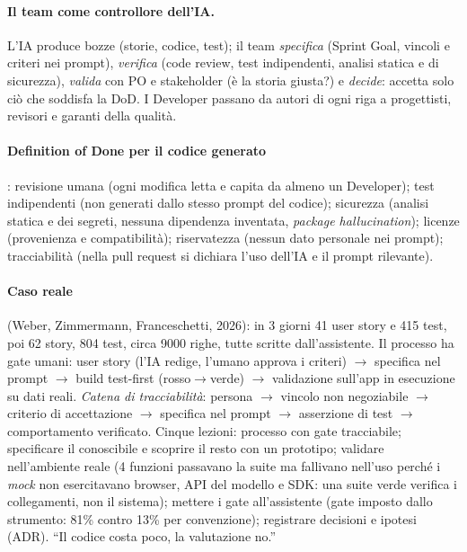 \documentclass[a4paper,12pt]{article}
\begin{document}
\paragraph{Il team come controllore dell'IA.} L'IA produce bozze (storie, codice, test); il
team \emph{specifica} (Sprint Goal, vincoli e criteri nei prompt), \emph{verifica} (code
review, test indipendenti, analisi statica e di sicurezza), \emph{valida} con PO e stakeholder
(è la storia giusta?) e \emph{decide}: accetta solo ciò che soddisfa la DoD. I Developer
passano da autori di ogni riga a progettisti, revisori e garanti della qualità.

\paragraph{Definition of Done per il codice generato}: revisione umana (ogni modifica letta e
capita da almeno un Developer); test indipendenti (non generati dallo stesso prompt del
codice); sicurezza (analisi statica e dei segreti, nessuna dipendenza inventata,
\emph{package hallucination}); licenze (provenienza e compatibilità); riservatezza (nessun
dato personale nei prompt); tracciabilità (nella pull request si dichiara l'uso dell'IA e il
prompt rilevante).

\paragraph{Caso reale} (Weber, Zimmermann, Franceschetti, 2026): in 3 giorni 41 user story e
415 test, poi 62 story, 804 test, circa 9000 righe, tutte scritte dall'assistente. Il
processo ha gate umani: user story (l'IA redige, l'umano approva i criteri) $\to$ specifica
nel prompt $\to$ build test-first (rosso$\to$verde) $\to$ validazione sull'app in esecuzione
su dati reali. \emph{Catena di tracciabilità}: persona $\to$ vincolo non negoziabile $\to$
criterio di accettazione $\to$ specifica nel prompt $\to$ asserzione di test $\to$
comportamento verificato. Cinque lezioni: processo con gate tracciabile; specificare il
conoscibile e scoprire il resto con un prototipo; validare nell'ambiente reale (4 funzioni
passavano la suite ma fallivano nell'uso perché i \emph{mock} non esercitavano browser, API
del modello e SDK: una suite verde verifica i collegamenti, non il sistema); mettere i gate
all'assistente (gate imposto dallo strumento: 81\% contro 13\% per convenzione); registrare
decisioni e ipotesi (ADR). ``Il codice costa poco, la valutazione no.''
\end{document}

